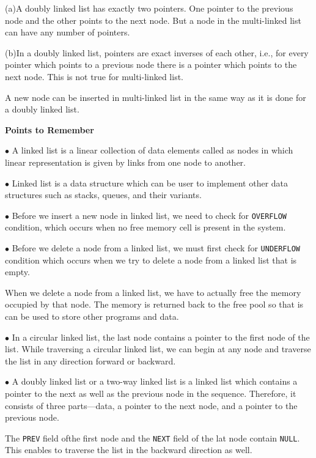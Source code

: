 \vskip 1mm
(a)\quad A doubly linked list has exactly two pointers. One pointer to the previous node and the other points to the next node. But a node in the multi-linked list can have any number of pointers.

\vskip 3mm
(b)\quad In a doubly linked list, pointers are exact inverses of each other, i.e., for every pointer which points to a previous node there is a pointer which points to the next node. This is not true for multi-linked list.

\vskip 1mm
A new node can be inserted in  multi-linked list in the same way as it is done for a doubly linked list.

\filbreak
\vskip 1cm
{\bf Points to Remember}

\vskip 1mm
$\bullet$ A linked list is a linear collection of data elements called as nodes in which linear representation is given by links from one node to another.

\vskip 3mm
$\bullet$ Linked list is a data structure which can be user to implement other data structures such as stacks, queues, and their variants.

$\bullet$ Before we insert a new node in linked list, we need to check for {\tt OVERFLOW} condition, which occurs when no free memory cell is present in the system.

\vskip 3mm
$\bullet$ Before we delete a node from a linked list, we must first check for {\tt UNDERFLOW} condition which occurs when we try to delete a node from a linked list that is empty.

\vskip 3mm
When we delete a node from a linked list, we have to actually free the memory occupied by that node. The memory is returned back to the free pool so that is can be used to store other programs and data.

\vskip 3mm
$\bullet$ In a circular linked list, the last node contains a pointer to the first node of the list. While traversing a circular linked list, we can begin at any node and traverse the list in any direction forward or backward.

\vskip 3mm
$\bullet$ A doubly linked list or a two-way linked list is a linked list which contains a pointer to the next as well as the previous node in the sequence. Therefore, it consists of three parts---data, a pointer to the next node, and a pointer to the previous node.

\vskip 3mm
The {\tt PREV} field ofthe first node and the {\tt NEXT} field of the lat node contain {\tt NULL}. This enables to traverse the list in the backward direction as well.

